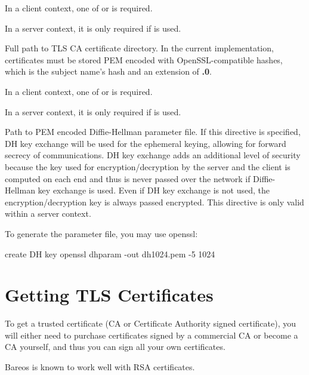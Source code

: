 \begin{description}
In a client context, one of
 or 
is required.

In a server context, it is only required if  is used.

\item [\linkResourceDirective{Dir}{Director}{TLS CA Certificate Dir}]%
Full path to TLS CA certificate directory.  In the current implementation,
certificates must be stored PEM encoded with OpenSSL-compatible hashes,
which is the subject name's hash and an extension of {\bf .0}.

In a client context, one of
 or 
is required.

In a server context, it is only required if  is used.


\item [\linkResourceDirective{Dir}{Director}{TLS DH File}]%
Path to PEM encoded Diffie-Hellman parameter file.  If this directive is
specified, DH key exchange will be used for the ephemeral keying, allowing
for forward secrecy of communications.  DH key exchange adds an additional
level of security because the key used for encryption/decryption by the
server and the client is computed on each end and thus is never passed over
the network if Diffie-Hellman key exchange is used.  Even if DH key
exchange is not used, the encryption/decryption key is always passed
encrypted.  This directive is only valid within a server context.

To generate the parameter file, you
may use openssl:

\begin{commands}{create DH key}
openssl dhparam -out dh1024.pem -5 1024
\end{commands}

\end{description}

\section{Getting TLS Certificates}

To get a trusted certificate (CA or Certificate Authority signed
certificate), you will either need to purchase certificates signed by a
commercial CA or become a CA
yourself, and thus you can sign all your own certificates.

Bareos is known to work well with RSA certificates.

